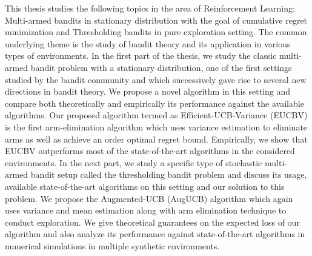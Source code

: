 This thesis studies the following topics in the area of Reinforcement Learning: Multi-armed bandits in stationary distribution with the goal of cumulative regret minimization and Thresholding bandits in pure exploration setting. The common underlying theme is the study of bandit theory and its application in various types of environments. In the first part of the thesis, we study the classic multi-armed bandit problem with a stationary distribution, one of the first settings studied by the bandit community and which successively gave rise to several new directions in bandit theory. We propose a novel algorithm in this setting and compare both theoretically and empirically its performance against the available algorithms. Our proposed algorithm termed as Efficient-UCB-Variance (EUCBV) is the first arm-elimination algorithm which uses variance estimation to eliminate arms as well as achieve an order optimal regret bound. Empirically, we show that EUCBV outperforms most of the state-of-the-art algorithms in the considered environments. In the next part, we study a specific type of stochastic multi-armed bandit setup called the thresholding bandit problem and discuss its usage, available state-of-the-art algorithms on this setting and our solution to this problem. We propose the Augmented-UCB (AugUCB) algorithm which again uses variance and mean estimation along with arm elimination technique to conduct exploration. We give theoretical guarantees on the expected loss of our algorithm and also analyze its performance against state-of-the-art algorithms in numerical simulations in multiple synthetic environments. 